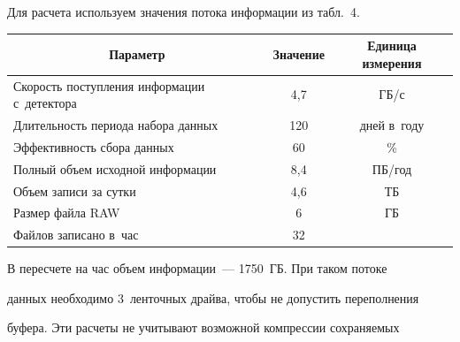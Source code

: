   Для расчета используем значения потока информации из табл.~4.





\begin{table}\small


\vspace*{-18pt}


\begin{center}




\vspace*{2ex}





\begin{tabular}{|l|c|c|}


\hline


\multicolumn{1}{|c|}{Параметр}&Значение&Единица измерения\\


\hline


Скорость поступления информации с~детектора&4,7&ГБ/с\\


Длительность периода набора данных&120&дней в~году\\


Эффективность сбора данных&60&\%\\


Полный объем исходной информации&8,4&ПБ/год\\


Объем записи за сутки&4,6&ТБ\\


Размер файла RAW&6&ГБ\\


Файлов записано в~час&32& \\


\hline


\end{tabular}


\end{center}


\end{table}





  В пересчете на час объем информации~--- 1750~ГБ. При таком потоке


данных необходимо 3~ленточных драйва, чтобы не допустить переполнения


буфера. Эти расчеты не учитывают возможной компрессии сохраняемых


